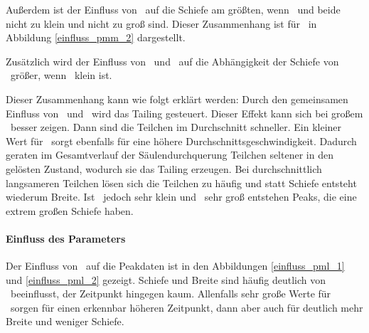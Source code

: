 Außerdem ist der Einfluss von \pmm\ auf die Schiefe am größten, wenn \pml\ und \pll beide nicht zu klein und nicht zu groß sind. Dieser Zusammenhang ist für \pml\ in Abbildung \ref{einfluss_pmm_2} dargestellt.

Zusätzlich wird der Einfluss von \pml\ und \pll\ auf die Abhängigkeit der Schiefe von \pmm\ größer, wenn \paa\ klein ist.


Dieser Zusammenhang kann wie folgt erklärt werden: Durch den gemeinsamen Einfluss von \pml\ und \pll\ wird das Tailing gesteuert. Dieser Effekt kann sich bei großem \pmm\ besser zeigen. Dann sind die Teilchen im Durchschnitt schneller. Ein kleiner Wert für \paa\ sorgt ebenfalls für eine höhere Durchschnittsgeschwindigkeit. Dadurch geraten im Gesamtverlauf der Säulendurchquerung Teilchen seltener in den gelösten Zustand, wodurch sie das Tailing erzeugen. Bei durchschnittlich langsameren Teilchen lösen sich die Teilchen zu häufig und statt Schiefe entsteht wiederum Breite.
Ist \paa\ jedoch sehr klein und \pll\ sehr groß entstehen Peaks, die eine extrem großen Schiefe haben. %


\clearpage

\paragraph*{Einfluss des Parameters \pml}
Der Einfluss von \pml\ auf die Peakdaten ist in den Abbildungen \ref{einfluss_pml_1} und \ref{einfluss_pml_2} gezeigt. Schiefe und Breite sind häufig deutlich von \pml\ beeinflusst, der Zeitpunkt hingegen kaum. Allenfalls sehr große Werte für \pml\ sorgen für einen erkennbar höheren Zeitpunkt, dann aber auch für deutlich mehr Breite und weniger Schiefe.

